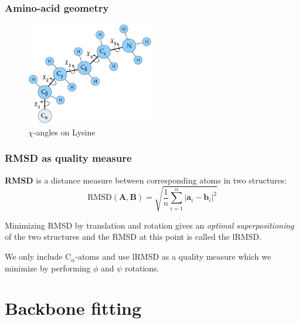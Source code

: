 \documentclass{beamer}
\renewcommand\v[1]{\boldsymbol{#1}}
\begin{document}
\begin{frame}[t, fragile]
  \frametitle{Amino-acid geometry}
  \vspace{0.5cm}
  \begin{figure}
    \centering
    \includegraphics[width=0.5\textwidth]{../rapport/figures/lysine.pdf}
    \caption{$\chi$-angles on Lysine}
    \label{fig:front}
  \end{figure}
\end{frame}

\begin{frame}[t, fragile]
  \frametitle{RMSD as quality measure}
  
  \textbf{RMSD} is a distance measure between corresponding atoms in two structures:
\begin{displaymath}
  \label{eq:rmsd}
  \text{RMSD}(\v{A}, \v{B}) = \sqrt{\frac{1}{n}\sum_{i=1}^n |\v{a}_i - \v{b}_i|^2}
\end{displaymath}

Minimizing RMSD by translation and rotation gives an \textit{optimal
  superpositioning} of the two structures and the RMSD at this point
is called the lRMSD.\\\vspace{0.5cm}

We only include C$_\alpha$-atoms and use lRMSD as a quality measure
which we minimize by performing $\phi$ and $\psi$ rotations.

  
\end{frame}

\section{Backbone fitting}
\end{document}
